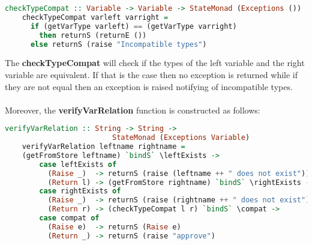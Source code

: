 \documentclass[a4paper, onecolumn]{article}
\begin{document}
    \begin{tcolorbox}
    \begin{lstlisting}[language=Haskell] 
    checkTypeCompat :: Variable -> Variable -> StateMonad (Exceptions ())
    checkTypeCompat varleft varright = 
      if (getVarType varleft) == (getVarType varright) 
        then returnS (returnE ())  
      else returnS (raise "Incompatible types")
    \end{lstlisting}
    \end{tcolorbox}
    
    \noindent The \textbf{checkTypeCompat} will check if the types of the left variable and the right variable are equivalent. If that is the case then no exception is returned while if they are not equal then an exception is raised notifying of incompatible types. \\ \\
    Moreover, the \textbf{verifyVarRelation} function is constructed as follows: 
    
    \begin{tcolorbox}
    \begin{lstlisting}[language=Haskell] 
    verifyVarRelation :: String -> String ->
                         StateMonad (Exceptions Variable)
    verifyVarRelation leftname rightname = 
    (getFromStore leftname) `bindS` \leftExists -> 
        case leftExists of
          (Raise _)  -> returnS (raise (leftname ++ " does not exist"))                               
          (Return l) -> (getFromStore rightname) `bindS` \rightExists -> 
        case rightExists of                                                                           
          (Raise _)  -> returnS (raise (rightname ++ " does not exist")
          (Return r) -> (checkTypeCompat l r) `bindS` \compat -> 
        case compat of 
          (Raise e)  -> returnS (Raise e)
          (Return _) -> returnS (raise "approve")
    \end{lstlisting}
    \end{tcolorbox}
    
\end{document}

